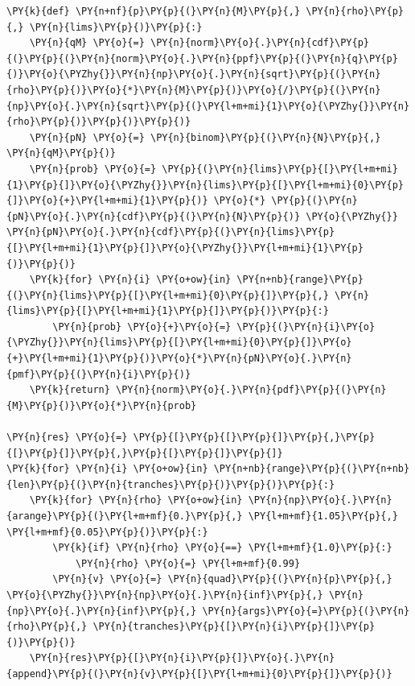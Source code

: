 \begin{Answer}
\begin{tcolorbox}[size=fbox, boxrule=1pt, colback=cellbackground, colframe=cellborder]
\begin{Verbatim}[commandchars=\\\{\}]
\PY{k}{def} \PY{n+nf}{p}\PY{p}{(}\PY{n}{M}\PY{p}{,} \PY{n}{rho}\PY{p}{,} \PY{n}{lims}\PY{p}{)}\PY{p}{:}
    \PY{n}{qM} \PY{o}{=} \PY{n}{norm}\PY{o}{.}\PY{n}{cdf}\PY{p}{(}\PY{p}{(}\PY{n}{norm}\PY{o}{.}\PY{n}{ppf}\PY{p}{(}\PY{n}{q}\PY{p}{)}\PY{o}{\PYZhy{}}\PY{n}{np}\PY{o}{.}\PY{n}{sqrt}\PY{p}{(}\PY{n}{rho}\PY{p}{)}\PY{o}{*}\PY{n}{M}\PY{p}{)}\PY{o}{/}\PY{p}{(}\PY{n}{np}\PY{o}{.}\PY{n}{sqrt}\PY{p}{(}\PY{l+m+mi}{1}\PY{o}{\PYZhy{}}\PY{n}{rho}\PY{p}{)}\PY{p}{)}\PY{p}{)}
    \PY{n}{pN} \PY{o}{=} \PY{n}{binom}\PY{p}{(}\PY{n}{N}\PY{p}{,} \PY{n}{qM}\PY{p}{)}
    \PY{n}{prob} \PY{o}{=} \PY{p}{(}\PY{n}{lims}\PY{p}{[}\PY{l+m+mi}{1}\PY{p}{]}\PY{o}{\PYZhy{}}\PY{n}{lims}\PY{p}{[}\PY{l+m+mi}{0}\PY{p}{]}\PY{o}{+}\PY{l+m+mi}{1}\PY{p}{)} \PY{o}{*} \PY{p}{(}\PY{n}{pN}\PY{o}{.}\PY{n}{cdf}\PY{p}{(}\PY{n}{N}\PY{p}{)} \PY{o}{\PYZhy{}} \PY{n}{pN}\PY{o}{.}\PY{n}{cdf}\PY{p}{(}\PY{n}{lims}\PY{p}{[}\PY{l+m+mi}{1}\PY{p}{]}\PY{o}{\PYZhy{}}\PY{l+m+mi}{1}\PY{p}{)}\PY{p}{)}
    \PY{k}{for} \PY{n}{i} \PY{o+ow}{in} \PY{n+nb}{range}\PY{p}{(}\PY{n}{lims}\PY{p}{[}\PY{l+m+mi}{0}\PY{p}{]}\PY{p}{,} \PY{n}{lims}\PY{p}{[}\PY{l+m+mi}{1}\PY{p}{]}\PY{p}{)}\PY{p}{:}
        \PY{n}{prob} \PY{o}{+}\PY{o}{=} \PY{p}{(}\PY{n}{i}\PY{o}{\PYZhy{}}\PY{n}{lims}\PY{p}{[}\PY{l+m+mi}{0}\PY{p}{]}\PY{o}{+}\PY{l+m+mi}{1}\PY{p}{)}\PY{o}{*}\PY{n}{pN}\PY{o}{.}\PY{n}{pmf}\PY{p}{(}\PY{n}{i}\PY{p}{)}        
    \PY{k}{return} \PY{n}{norm}\PY{o}{.}\PY{n}{pdf}\PY{p}{(}\PY{n}{M}\PY{p}{)}\PY{o}{*}\PY{n}{prob}

\PY{n}{res} \PY{o}{=} \PY{p}{[}\PY{p}{[}\PY{p}{]}\PY{p}{,}\PY{p}{[}\PY{p}{]}\PY{p}{,}\PY{p}{[}\PY{p}{]}\PY{p}{]}
\PY{k}{for} \PY{n}{i} \PY{o+ow}{in} \PY{n+nb}{range}\PY{p}{(}\PY{n+nb}{len}\PY{p}{(}\PY{n}{tranches}\PY{p}{)}\PY{p}{)}\PY{p}{:}
    \PY{k}{for} \PY{n}{rho} \PY{o+ow}{in} \PY{n}{np}\PY{o}{.}\PY{n}{arange}\PY{p}{(}\PY{l+m+mf}{0.}\PY{p}{,} \PY{l+m+mf}{1.05}\PY{p}{,} \PY{l+m+mf}{0.05}\PY{p}{)}\PY{p}{:}
        \PY{k}{if} \PY{n}{rho} \PY{o}{==} \PY{l+m+mf}{1.0}\PY{p}{:}
            \PY{n}{rho} \PY{o}{=} \PY{l+m+mf}{0.99}
        \PY{n}{v} \PY{o}{=} \PY{n}{quad}\PY{p}{(}\PY{n}{p}\PY{p}{,} \PY{o}{\PYZhy{}}\PY{n}{np}\PY{o}{.}\PY{n}{inf}\PY{p}{,} \PY{n}{np}\PY{o}{.}\PY{n}{inf}\PY{p}{,} \PY{n}{args}\PY{o}{=}\PY{p}{(}\PY{n}{rho}\PY{p}{,} \PY{n}{tranches}\PY{p}{[}\PY{n}{i}\PY{p}{]}\PY{p}{)}\PY{p}{)}
    \PY{n}{res}\PY{p}{[}\PY{n}{i}\PY{p}{]}\PY{o}{.}\PY{n}{append}\PY{p}{(}\PY{n}{v}\PY{p}{[}\PY{l+m+mi}{0}\PY{p}{]}\PY{p}{)}
\end{Verbatim}
\end{tcolorbox}
		

\end{Answer}
